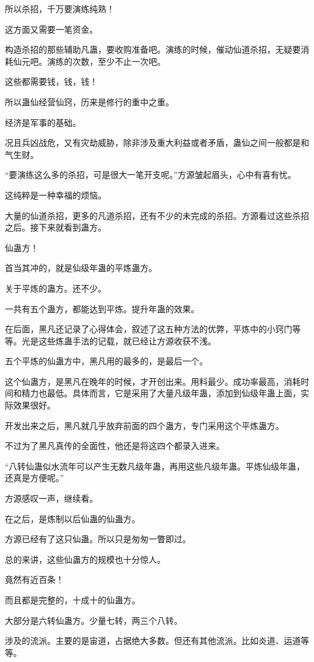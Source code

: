 \begin{this_body}
所以杀招，千万要演练纯熟！

这方面又需要一笔资金。

构造杀招的那些辅助凡蛊，要收购准备吧。演练的时候，催动仙道杀招，无疑要消耗仙元吧。演练的次数，至少不止一次吧。

这些都需要钱，钱，钱！

所以蛊仙经营仙窍，历来是修行的重中之重。

经济是军事的基础。

况且兵凶战危，又有灾劫威胁，除非涉及重大利益或者矛盾，蛊仙之间一般都是和气生财。

“要演练这么多的杀招，可是很大一笔开支呢。”方源皱起眉头，心中有喜有忧。

这纯粹是一种幸福的烦恼。

大量的仙道杀招，更多的凡道杀招，还有不少的未完成的杀招。方源看过这些杀招之后。接下来就看到蛊方。

仙蛊方！

首当其冲的，就是仙级年蛊的平炼蛊方。

关于平炼的蛊方。还不少。

一共有五个蛊方，都能达到平炼。提升年蛊的效果。

在后面，黑凡还记录了心得体会，叙述了这五种方法的优弊，平炼中的小窍门等等。光是这些炼蛊手法的记载，就已经让方源收获不浅。

五个平炼的仙蛊方中，黑凡用的最多的，是最后一个。

这个仙蛊方，是黑凡在晚年的时候，才开创出来。用料最少。成功率最高，消耗时间和精力也最低。具体而言，它是采用了大量凡级年蛊，添加到仙级年蛊上面，实际效果很好。

开发出来之后，黑凡就几乎放弃前面的四个蛊方，专门采用这个平炼蛊方。

不过为了黑凡真传的全面性，他还是将这四个都录入进来。

“八转仙蛊似水流年可以产生无数凡级年蛊，再用这些凡级年蛊。平炼仙级年蛊，还真是方便呢。”

方源感叹一声，继续看。

在之后，是炼制以后仙蛊的仙蛊方。

方源已经有了这只仙蛊。所以只是匆匆一瞥即过。

总的来讲，这些仙蛊方的规模也十分惊人。

竟然有近百条！

而且都是完整的，十成十的仙蛊方。

大部分是六转仙蛊方。少量七转，两三个八转。

涉及的流派。主要的是宙道，占据绝大多数。但还有其他流派。比如炎道、运道等等。


\end{this_body}

